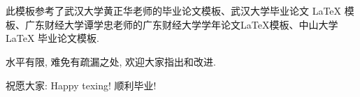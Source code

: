 \chapter*{{ }\hfill{}\hfill{ }}

此模板参考了武汉大学黄正华老师的毕业论文模板、武汉大学毕业论文 LaTeX 模板、广东财经大学谭学忠老师的广东财经大学学年论文LaTeX模板、中山大学 \LaTeX{} 毕业论文模板.

水平有限, 难免有疏漏之处, 欢迎大家指出和改进.

祝愿大家: Happy texing! 顺利毕业!
